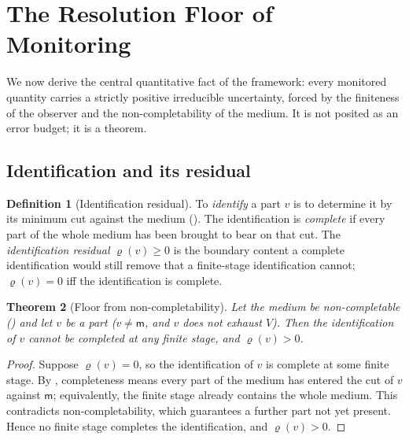 \documentclass[11pt,twocolumn,a4paper]{article}
\theoremstyle{thmstyle}
\newtheorem{theorem}{Theorem}[section]
\theoremstyle{definition}
\newtheorem{definition}[theorem]{Definition}
\theoremstyle{remark}
\newcommand{\V}{V}
\newcommand{\med}{\mathsf{m}}
\begin{document}
\section{The Resolution Floor of Monitoring}
\label{sec:floor}

We now derive the central quantitative fact of the framework: every
monitored quantity carries a strictly positive irreducible uncertainty,
forced by the finiteness of the observer and the non-completability of the
medium. It is not posited as an error budget; it is a theorem.

\subsection{Identification and its residual}

\begin{definition}[Identification residual]
\label{def:residual}
To \emph{identify} a part $v$ is to determine it by its minimum cut against
the medium (). The identification is \emph{complete} if
every part of the whole medium has been brought to bear on that cut. The
\emph{identification residual} $\varrho(v)\ge0$ is the boundary content a
complete identification would still remove that a finite-stage
identification cannot; $\varrho(v)=0$ iff the identification is complete.
\end{definition}

\begin{theorem}[Floor from non-completability]
\label{thm:floor-derived}
Let the medium be non-completable () and let $v$ be a part
($v\neq\med$, and $v$ does not exhaust $\V$). Then the identification of
$v$ cannot be completed at any finite stage, and $\varrho(v)>0$.
\end{theorem}

\begin{proof}
Suppose $\varrho(v)=0$, so the identification of $v$ is complete at some
finite stage. By , completeness means every part of the
medium has entered the cut of $v$ against $\med$; equivalently, the finite
stage already contains the whole medium. This contradicts
non-completability, which guarantees a further part not yet present.
Hence no finite stage completes the identification, and $\varrho(v)>0$.
\end{proof}
\end{document}
